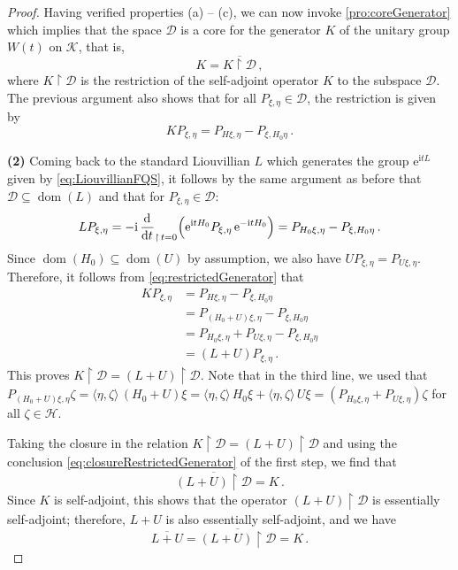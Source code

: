 \documentclass[a4paper, twoside, 11pt, reqno]{amsart}
\theoremstyle{definition}
\theoremstyle{plain}
\renewcommand{\subset}{\subseteq}
\newcommand{\MD}{\mathcal{D}}
\newcommand{\MH}{\mathcal{H}}
\newcommand{\MK}{\mathcal{K}}
\newcommand{\ii}{\mathrm{i}}
\newcommand{\ee}{\mathrm{e}}
\newcommand{\1}{\mathbf{1}}
\newcommand{\diff}{\mathop{}\!\mathrm{d}}
\DeclareMathOperator{\dom}{dom}
\newcommand{\braket}[2][]{#1\langle{#2}#1\rangle}
\newcommand{\odbound}[4][]{\frac{\diff^{#1} #2}{\diff {#3}^{#1}}_{\upharpoonright \, #4}}
\newcommand{\restr}{\!\upharpoonright\!}
\newcommand{\oln}[1]{\overline{#1}}
\begin{document}
\begin{proof}
    Having verified properties (a) -- (c), we can now invoke \cref{pro:coreGenerator} which implies that the space $\MD$ is a core for the generator $K$ of the unitary group $W(t)$ on $\MK$, that is,
    \begin{equation}\label{eq:closureRestrictedGenerator}
        K = \oln{K \restr \MD} \, ,
    \end{equation}
    where $K \restr \MD$ is the restriction of the self-adjoint operator $K$ to the subspace $\MD$. The previous argument also shows that for all $P_{\xi, \eta} \in \MD$, the restriction is given by
    \begin{equation}\label{eq:restrictedGenerator}
        K P_{\xi, \eta} = P_{H \xi, \eta} - P_{\xi, H_0 \eta} \, .
    \end{equation}

    \textbf{(2)} Coming back to the standard Liouvillian $L$ which generates the group $\ee^{\ii t L}$ given by \cref{eq:LiouvillianFQS}, it follows by the same argument as before that $\MD \subset \dom(L)$ and that for $P_{\xi, \eta} \in \MD$:
    \begin{equation*}
        L P_{\xi, \eta} = - \ii \, \odbound{}{t}{t=0} \Bigl(\ee^{\ii t H_0} P_{\xi, \eta} \, \ee^{- \ii t H_0}\Bigr) = P_{H_0 \xi, \eta} - P_{\xi, H_0 \eta} \, .
    \end{equation*}
    Since $\dom(H_0) \subset \dom(U)$ by assumption, we also have $U P_{\xi ,\eta} = P_{U \xi, \eta}$. Therefore, it follows from \cref{eq:restrictedGenerator} that
    \begin{align*}
        K P_{\xi, \eta} &= P_{H \xi, \eta} - P_{\xi, H_0 \eta} \\
        &= P_{(H_0 + U) \xi, \eta} - P_{\xi, H_0 \eta} \\
        &= P_{H_0 \xi, \eta} + P_{U \xi, \eta} - P_{\xi, H_0 \eta} \\
        &= (L + U) P_{\xi, \eta} \, .
    \end{align*}
    This proves $K \restr \MD = (L + U) \restr \MD$. Note that in the third line, we used that $P_{(H_0 + U) \xi, \eta} \zeta = \braket{\eta, \zeta} \, (H_0 + U) \xi = \braket{\eta, \zeta} \, H_0 \xi + \braket{\eta, \zeta} \, U \xi = (P_{H_0 \xi, \eta} + P_{U \xi, \eta}) \zeta$ for all $\zeta \in \MH$.
    
    Taking the closure in the relation $K \restr \MD = (L + U) \restr \MD$ and using the conclusion \eqref{eq:closureRestrictedGenerator} of the first step, we find that
    \begin{equation*}
        \oln{(L + U) \restr \MD} = K \, .
    \end{equation*}
    Since $K$ is self-adjoint, this shows that the operator $(L + U) \restr \MD$ is essentially self-adjoint; therefore, $L + U$ is also essentially self-adjoint, and we have
    \begin{equation*}
        \oln{L + U} = \oln{(L + U) \restr \MD} = K \, .
    \end{equation*}
    

\end{proof}
\end{document}

